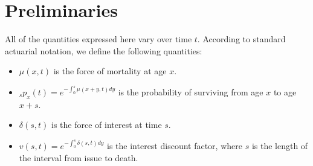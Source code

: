 \documentclass[12pt]{article}
\begin{document}



\section{Preliminaries}\label{preliminaries}

All of the quantities expressed here vary over time $t$. According to standard actuarial notation, we define the following quantities:

\begin{itemize}

\item
\(\mu(x,t)\) is the force of mortality at age \(x\).

\item
$_sp_x(t)=e^{-\int_{0}^{s}\mu(x+y,t)dy}$ is the probability of surviving from age \(x\) to age \(x+s\).


\item
\(\delta(s,t)\) is the force of interest at time $s$.

\item 

${v}(s,t)=e^{-\int_{0}^{s}\delta(s,t)dy}$ is the interest discount factor, where $s$ is the length of the interval from issue to death.

\end{itemize}
\end{document}
